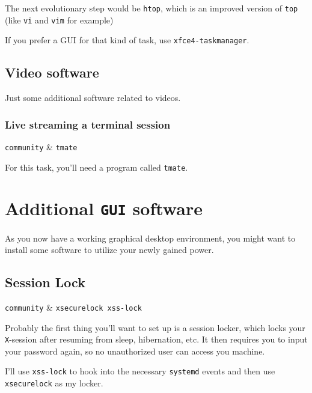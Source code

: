 \documentclass[10pt]{dustdoc}
\begin{document}
The next evolutionary step would be \texttt{htop}, which is an improved version of \texttt{top} (like \texttt{vi} and \texttt{vim} for example)

If you prefer a GUI for that kind of task, use \texttt{xfce4-taskmanager}.

\subsection{Video software}%
\label{sec:fish-video-software}

Just some additional software related to videos.

\subsubsection{Live streaming a terminal session}%
\label{sec:live-streaming-a-terminal-session}

\begin{pkgtable}
    \texttt{community} & \texttt{tmate} \\
\end{pkgtable}

For this task, you’ll need a program called \texttt{tmate}.

\section{Additional \texttt{GUI} software}%
\label{sec:additional-gui-software}

As you now have a working graphical desktop environment, you might want to install some software to utilize your newly gained power.

\subsection{Session Lock}%
\label{sec:session-lock}

\begin{pkgtable}
    \texttt{community} & \texttt{xsecurelock xss-lock} \\
\end{pkgtable}

Probably the first thing you’ll want to set up is a session locker, which locks your \texttt{X}-session after resuming from sleep, hibernation, etc.
It then requires you to input your password again, so no unauthorized user can access you machine.

I’ll use \texttt{xss-lock} to hook into the necessary \texttt{systemd} events and then use \texttt{xsecurelock} as my locker.
\end{document}
